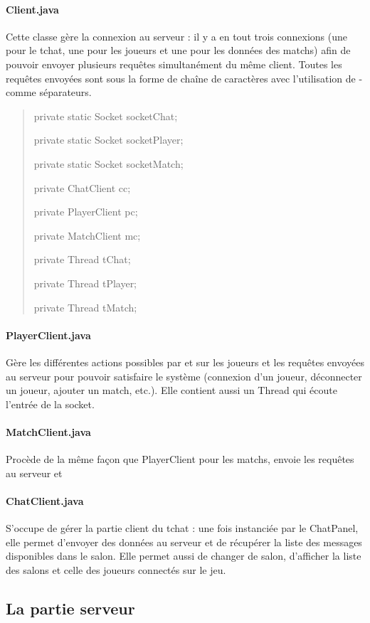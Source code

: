 \documentclass[a4paper,12pt]{report}
\begin{document}
\paragraph{Client.java}
Cette classe gère la connexion au serveur : il y a en tout trois connexions (une pour le tchat, une pour les joueurs et une pour les données des matchs) afin de pouvoir envoyer plusieurs requêtes simultanément du même client. Toutes les requêtes envoyées sont sous la forme de chaîne de caractères avec l'utilisation de \og - \fg comme séparateurs.
\begin{quote}
	private static Socket socketChat;
    
	private static Socket socketPlayer;
    
	private static Socket socketMatch;
    
	private ChatClient cc;

	private PlayerClient pc;

	private MatchClient mc;

	private Thread tChat;

	private Thread tPlayer;
    
	private Thread tMatch;
\end{quote}
\paragraph{PlayerClient.java}
Gère les différentes actions possibles par et sur les joueurs et les requêtes envoyées au serveur pour pouvoir satisfaire le système (connexion d'un joueur, déconnecter un joueur, ajouter un match, etc.). Elle contient aussi un Thread qui écoute l'entrée de la socket.
\paragraph{MatchClient.java}
Procède de la même façon que PlayerClient pour les matchs, envoie les requêtes au serveur et 
\paragraph{ChatClient.java}
S'occupe de gérer la partie client du tchat : une fois instanciée par le ChatPanel, elle permet d'envoyer des données au serveur et de récupérer la liste des messages disponibles dans le salon. Elle permet aussi de changer de salon, d'afficher la liste des salons et celle des joueurs connectés sur le jeu.
\subsection{La partie serveur}
\end{document}
